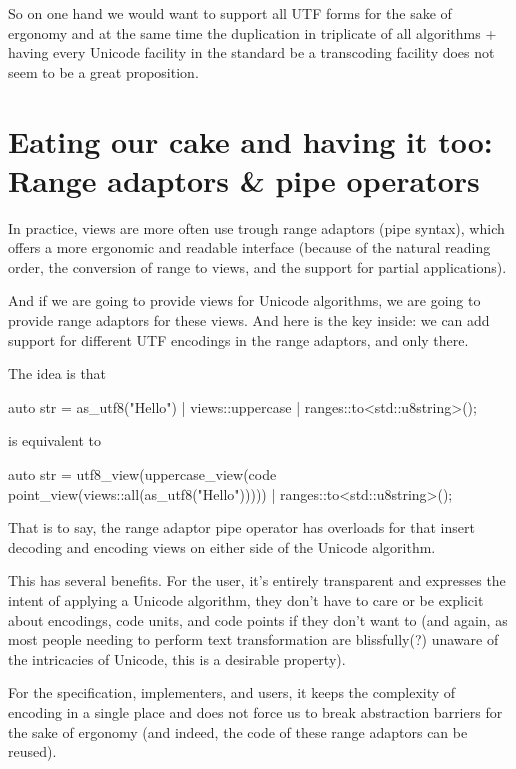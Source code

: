 \documentclass{wg21}
\begin{document}
So on one hand we would want to support all UTF forms for the sake of ergonomy and at the same time the duplication in triplicate of all algorithms
+ having every Unicode facility in the standard be a transcoding facility does not seem to be a great proposition.

\section{Eating our cake and having it too: Range adaptors \& pipe operators}

In practice, views are more often use trough range adaptors (pipe syntax), which offers a more ergonomic and readable interface
(because of the natural reading order, the conversion of range to views, and the support for partial applications).

And if we are going to provide views for Unicode algorithms, we are going to provide range adaptors for these views.
And here is the key inside: we can add support for different UTF encodings in the range adaptors, and only there.

The idea is that

\begin{colorblock}
auto str = as_utf8("Hello") | views::uppercase | ranges::to<std::u8string>();
\end{colorblock}

is equivalent to

\begin{colorblock}
auto str = utf8_view(uppercase_view(code point_view(views::all(as_utf8("Hello")))))
 | ranges::to<std::u8string>();
\end{colorblock}

That is to say, the range adaptor pipe operator has overloads for  that insert decoding and encoding views on either side of the Unicode algorithm.

This has several benefits.
For the user, it's entirely transparent and expresses the intent of applying a Unicode algorithm, they don't have to care or be explicit about encodings, code units, and
code points if they don't want to (and again, as most people needing to perform text transformation are blissfully(?) unaware of the intricacies of Unicode, this is a desirable property).

For the specification, implementers, and users, it keeps the complexity of encoding in a single place and does not force us to break abstraction barriers for the sake of ergonomy (and indeed, the code of these range adaptors can be reused).
\end{document}
